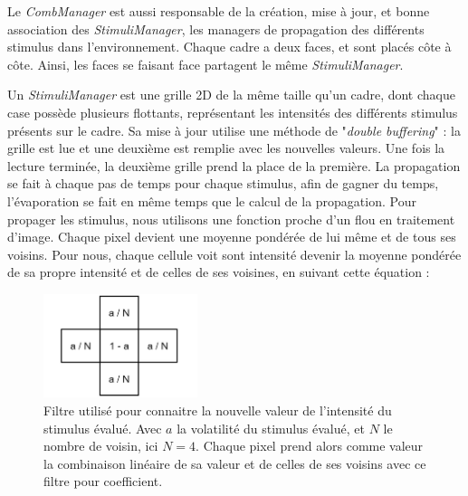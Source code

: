 			Le \textit{CombManager} est aussi responsable de la création, mise à jour, et bonne association des \textit{StimuliManager}, les managers de propagation des différents stimulus dans l'environnement. Chaque cadre a deux faces, et sont placés côte à côte. Ainsi, les faces se faisant face partagent le même \textit{StimuliManager}. 
			
			
			Un \textit{StimuliManager} est une grille 2D de la même taille qu'un cadre, dont chaque case possède plusieurs flottants, représentant les intensités des différents stimulus présents sur le cadre. Sa mise à jour utilise une méthode de "\textit{double buffering}" : la grille est lue et une deuxième est remplie avec les nouvelles valeurs. Une fois la lecture terminée, la deuxième grille prend la place de la première. La propagation se fait à chaque pas de temps pour chaque stimulus, afin de gagner du temps, l'évaporation se fait en même temps que le calcul de la propagation. Pour propager les stimulus, nous utilisons une fonction proche d'un flou en traitement d'image. Chaque pixel devient une moyenne pondérée de lui même et de tous ses voisins. Pour nous, chaque cellule voit sont intensité devenir la moyenne pondérée de sa propre intensité et de celles de ses voisines, en suivant cette équation :
			
			\begin{figure}
			\centering
			\includegraphics[width=0.4\textwidth]{./Pictures/Figures/flou.JPG}
			\caption{Filtre utilisé pour connaitre la nouvelle valeur de l'intensité du stimulus évalué. Avec $a$ la volatilité du stimulus évalué, et $N$ le nombre de voisin, ici $N=4$. Chaque pixel prend alors comme valeur la combinaison linéaire de sa valeur et de celles de ses voisins avec ce filtre pour coefficient.}
			\label{flou}
			\end{figure}
			
